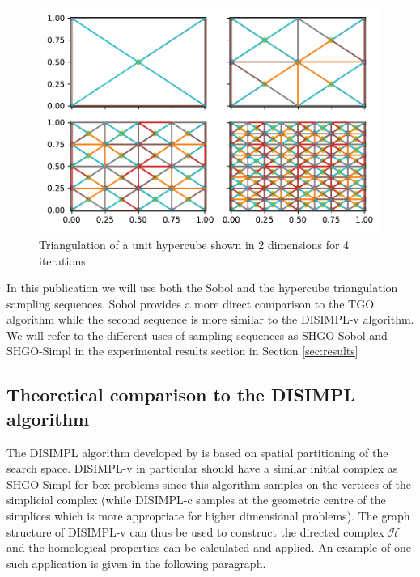\begin{figure}
\centerline{\includegraphics[scale=0.8]{./Fig10.pdf}}
{\caption{Triangulation of a unit hypercube shown in 2 dimensions for 4 iterations  \label{fig:triangles} }}
\end{figure}

In this publication we will use both the Sobol and the hypercube triangulation sampling sequences. Sobol provides a more direct comparison to the TGO algorithm while the second sequence is more similar to the DISIMPL-v algorithm. We will refer to the different uses of sampling sequences as SHGO-Sobol and SHGO-Simpl in the experimental results section in Section \ref{sec:results}

\subsection{Theoretical comparison to the DISIMPL algorithm}
The DISIMPL algorithm developed by \citeauthor{Paul2014b} \cite{Paul2014b, paulavivcius2014simplicial, Paul2014a} is based on spatial partitioning of the search space. DISIMPL-v in particular should have a similar initial complex as SHGO-Simpl for box problems since this algorithm samples on the vertices of the simplicial complex (while DISIMPL-c samples at the geometric centre of the simplices which is more appropriate for higher dimensional problems). The graph structure of DISIMPL-v can thus be used to construct the directed complex $\mathcal{H}$ and the homological properties can be calculated and applied. An example of one such application is given in the following paragraph.

